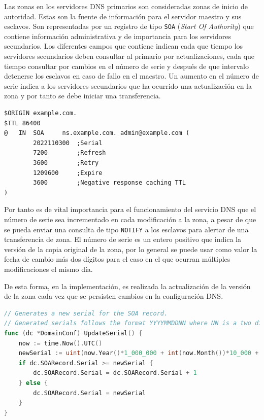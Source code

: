 Las zonas en los servidores DNS primarios son consideradas zonas de inicio de autoridad. Estas son la fuente de información para el servidor maestro y sus esclavos. Son representadas por un registro de tipo \verb|SOA| (\textit{Start Of Authority}) que contiene información administrativa y de importancia para los servidores secundarios. Los diferentes campos que contiene indican cada que tiempo los servidores secundarios deben consultar al primario por actualizaciones, cada que tiempo consultar por cambios en el número de serie y después de que intervalo detenerse los esclavos en caso de fallo en el maestro. Un aumento en el número de serie indica a los servidores secundarios que ha ocurrido una actualización en la zona y por tanto se debe iniciar una transferencia.

\begin{lstlisting}[frame=single, numbers=none, caption=Ejemplo de zona con \textit{SOA}.]
$ORIGIN example.com.
$TTL 86400
@   IN  SOA     ns.example.com. admin@example.com (
        2022110300  ;Serial
        7200        ;Refresh
        3600        ;Retry
        1209600     ;Expire
        3600        ;Negative response caching TTL
)
\end{lstlisting}

Por tanto es de vital importancia para el funcionamiento del servicio DNS que el número de serie sea incrementado en cada modificación a la zona, a pesar de que se pueda enviar una consulta de tipo \verb|NOTIFY| a los esclavos para alertar de una transferencia de zona. El número de serie es un entero positivo que indica la versión de la copia original de la zona, por lo general se puede usar como valor la fecha de cambio más dos dígitos para el caso en el que ocurran múltiples modificaciones el mismo día.

De esta forma, en la implementación, es realizada la actualización de la versión de la zona cada vez que se persisten cambios en la configuración DNS.

\begin{lstlisting}[frame=single, language=Go]
// Generates a new serial for the SOA record.
// Generated serials follows the format YYYYMMDDNN where NN is a two digits identifier.
func (dc *DomainConf) UpdateSerial() {
    now := time.Now().UTC()
    newSerial := uint(now.Year()*1_000_000 + int(now.Month())*10_000 + now.Day()*100)
    if dc.SOARecord.Serial >= newSerial {
        dc.SOARecord.Serial = dc.SOARecord.Serial + 1
    } else {
        dc.SOARecord.Serial = newSerial
    }
}
\end{lstlisting}

